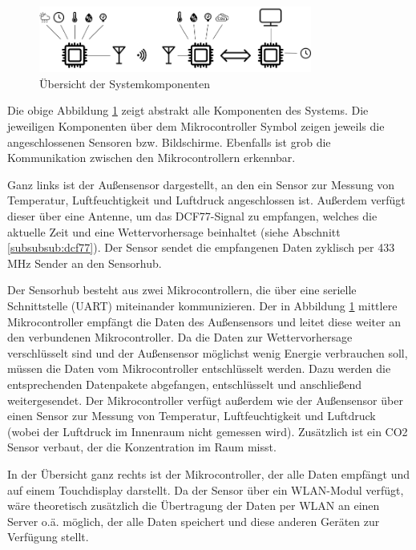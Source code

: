 \documentclass[a4paper,11pt]{article}
\begin{document}
\begin{figure}[H]
  \centering
  \includegraphics[width = 0.8\textwidth]{Systemuebersicht}
  \caption{Übersicht der Systemkomponenten}
  \label{fig:systemuebersicht}
\end{figure}

Die obige Abbildung \ref{fig:systemuebersicht} zeigt abstrakt alle Komponenten des Systems. Die jeweiligen Komponenten über dem Mikrocontroller Symbol
zeigen jeweils die angeschlossenen Sensoren bzw. Bildschirme. Ebenfalls ist grob die Kommunikation zwischen den Mikrocontrollern erkennbar. 

\vspace{0.2cm}
\noindent
Ganz links ist der Außensensor dargestellt, an den ein Sensor zur Messung von Temperatur, Luftfeuchtigkeit und Luftdruck angeschlossen ist. 
Außerdem verfügt dieser über eine Antenne, um das DCF77-Signal zu empfangen, welches die aktuelle Zeit und eine Wettervorhersage beinhaltet (siehe Abschnitt \ref{subsubsub:dcf77}).
Der Sensor sendet die empfangenen Daten zyklisch per 433 MHz Sender an den Sensorhub. 

\vspace{0.2cm}
\noindent
Der Sensorhub besteht aus zwei Mikrocontrollern, die über eine serielle Schnittstelle (UART) miteinander kommunizieren. Der in Abbildung \ref{fig:systemuebersicht} mittlere Mikrocontroller
empfängt die Daten des Außensensors und leitet diese weiter an den verbundenen Mikrocontroller. Da die Daten zur Wettervorhersage verschlüsselt sind und der Außensensor möglichst
wenig Energie verbrauchen soll, müssen die Daten vom Mikrocontroller entschlüsselt werden. Dazu werden die entsprechenden Datenpakete abgefangen, entschlüsselt und anschließend weitergesendet. 
Der Mikrocontroller verfügt außerdem wie der Außensensor über einen Sensor zur Messung von Temperatur, Luftfeuchtigkeit und Luftdruck (wobei der Luftdruck im Innenraum nicht gemessen wird). 
Zusätzlich ist ein CO2 Sensor verbaut, der die Konzentration im Raum misst. 

\vspace{0.2cm}
\noindent
In der Übersicht ganz rechts ist der Mikrocontroller, der alle Daten empfängt und auf einem Touchdisplay darstellt. Da der Sensor über ein WLAN-Modul verfügt, wäre theoretisch
zusätzlich die Übertragung der Daten per WLAN an einen Server o.ä. möglich, der alle Daten speichert und diese anderen Geräten zur Verfügung stellt. 
\end{document}

